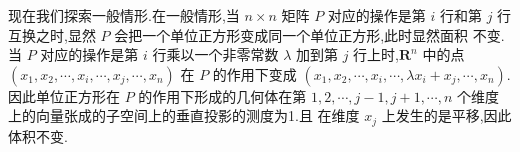 \documentclass[a4paper, 12pt]{article} %
\begin{document}
现在我们探索一般情形.在一般情形,当 $n\times n$ 矩阵 $P$ 对应的操作是第
$i$ 行和第 $j$ 行互换之时,显然 $P$ 会把一个单位正方形变成同一个单位正方形,此时显然面积
不变.当 $P$ 对应的操作是第 $i$ 行乘以一个非零常数 $\lambda$ 加到第 $j$
行上时,$\mathbf{R}^n$ 中的点 $(x_1,x_2,\cdots,x_i,\cdots,x_j,\cdots,x_n)$
在 $P$ 的作用下变成 $(x_1,x_2,\cdots,x_i,\cdots,\lambda
x_i+x_j,\cdots,x_n)$.因此单位正方形在 $P$ 的作用下形成的几何体在第
$1,2,\cdots,j-1,j+1,\cdots,n$ 个维度上的向量张成的子空间上的垂直投影的测度为1.且
在维度 $x_j$ 上发生的是平移,因此体积不变.
  

  

  
\end{document}
